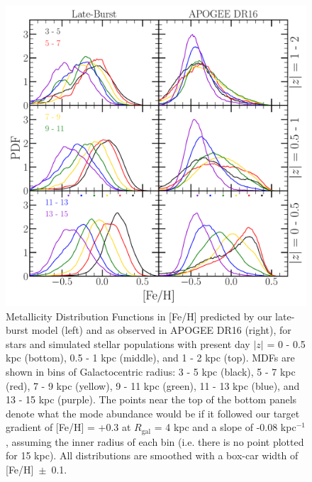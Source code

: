 \documentclass[a4paper, fleqn, usenatbib, useAMS]{mnras}
\begin{document}
\begin{figure} 
\centering 
\includegraphics[scale = 0.34]{mdf_3panel_lateburst_Fe.pdf} 
\caption{Metallicity Distribution Functions in [Fe/H] predicted by our 
late-burst model (left) and as observed in APOGEE DR16 (right), for stars and 
simulated stellar populations with present day $\left|z\right|$ = 0 - 0.5 kpc 
(bottom), 0.5 - 1 kpc (middle), and 1 - 2 kpc (top). MDFs are shown in bins 
of Galactocentric radius: 3 - 5 kpc (black), 5 - 7 kpc (red), 7 - 9 kpc 
(yellow), 9 - 11 kpc (green), 11 - 13 kpc (blue), and 13 - 15 kpc (purple). 
The points near the top of the bottom panels denote what the mode abundance 
would be if it followed our target gradient of [Fe/H] = +0.3 at $R_\text{gal}$ 
= 4 kpc and a slope of -0.08 kpc$^{-1}$, assuming the inner radius of each bin 
(i.e. there is no point plotted for 15 kpc). All distributions are smoothed 
with a box-car width of [Fe/H]~$\pm$~0.1. } 
\label{fig:mdf_3panel_fe} 
\end{figure} 
\end{document}
